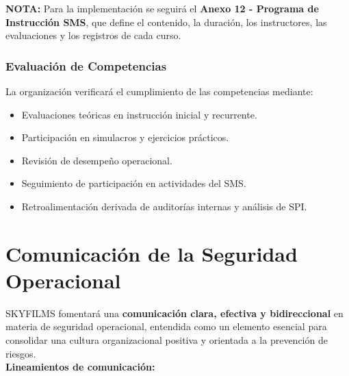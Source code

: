 \textbf{NOTA:} Para la implementación se seguirá el \textbf{Anexo 12 - Programa de Instrucción SMS}, que define el contenido, la duración, los instructores, las evaluaciones y los registros de cada curso.
\subsubsection{Evaluación de Competencias}

    La organización verificará el cumplimiento de las competencias mediante:
        \begin{itemize}
            \item Evaluaciones teóricas en instrucción inicial y recurrente.

            \item Participación en simulacros y ejercicios prácticos.

            \item Revisión de desempeño operacional.

            \item Seguimiento de participación en actividades del SMS.

            \item Retroalimentación derivada de auditorías internas y análisis de SPI.
        \end{itemize}



\section{Comunicación de la Seguridad Operacional}
SKYFILMS fomentará una \textbf{comunicación clara, efectiva y bidireccional} en materia de seguridad operacional, entendida como un elemento esencial para consolidar una cultura organizacional positiva y orientada a la prevención de riesgos.\\

\textbf{Lineamientos de comunicación:}

